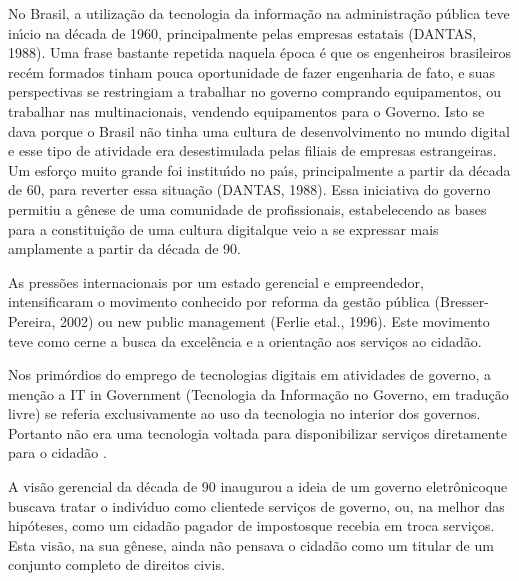 \documentclass[
12pt,		%
openright,	%
twoside,  %
a4paper,			%
chapter=TITLE,		%
english,			%
french,				%
spanish,			%
brazil				%
]{USPSC-classe/USPSC}
\begin{document}
No Brasil, a utiliza\c{c}\~ao da tecnologia da informa\c{c}\~ao na administra\c{c}\~ao p\'ublica teve in\'{\i}cio na d\'ecada de 1960, principalmente pelas empresas estatais  (DANTAS, 1988). Uma frase bastante repetida naquela \'epoca \'e que os engenheiros brasileiros rec\'em formados tinham pouca oportunidade de fazer engenharia de fato, e suas perspectivas se restringiam a trabalhar no governo comprando equipamentos, ou trabalhar nas multinacionais, vendendo equipamentos para o Governo. Isto se dava porque o Brasil n\~ao tinha uma cultura de desenvolvimento no mundo digital e esse tipo de atividade era desestimulada pelas filiais de empresas estrangeiras. Um esfor\c{c}o muito grande foi institu\'{\i}do no pa\'{\i}s, principalmente a partir da d\'ecada de 60, para reverter essa situa\c{c}\~ao  (DANTAS, 1988). Essa iniciativa do governo permitiu a g\^enese de uma comunidade de profissionais, estabelecendo as bases para a constitui\c{c}\~ao de uma \textquotedbl cultura digital\textquotedbl  que veio a se expressar mais amplamente a partir da d\'ecada de 90.




As press\~oes internacionais por um estado \textquotedbl gerencial e empreendedor, intensificaram o movimento conhecido por reforma da gest\~ao p\'ublica (Bresser-Pereira, 2002) ou new public management (Ferlie etal., 1996). Este movimento teve como cerne a \textquotedbl busca da excel\^encia e a orienta\c{c}\~ao aos servi\c{c}os ao cidad\~ao.




Nos prim\'ordios do emprego de tecnologias digitais em atividades de governo, a men\c{c}\~ao a \textquotedbl IT in Government (\textquotedbl Tecnologia da Informa\c{c}\~ao no Governo, em tradu\c{c}\~ao livre) se referia exclusivamente ao uso da tecnologia no interior dos governos. Portanto n\~ao era uma tecnologia voltada para disponibilizar servi\c{c}os diretamente para o cidad\~ao .




A vis\~ao gerencial da d\'ecada de 90 inaugurou a ideia de um \textquotedbl governo eletr\^onico\textquotedbl  que buscava tratar o indiv\'{\i}duo como \textquotedbl cliente\textquotedbl  de servi\c{c}os de governo, ou, na melhor das hip\'oteses, como um cidad\~ao \textquotedbl pagador de impostos\textquotedbl  que recebia em troca servi\c{c}os. Esta vis\~ao, na sua g\^enese, ainda n\~ao pensava o cidad\~ao como um titular de um conjunto completo de direitos civis.
\end{document}
